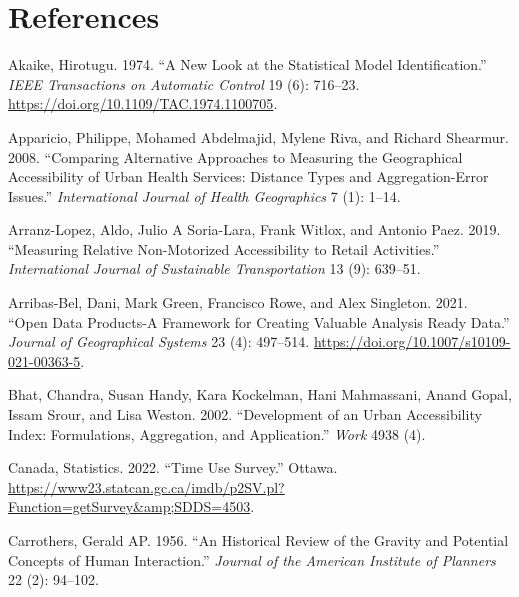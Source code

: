 \documentclass[preprint, 3p,
authoryear]{elsarticle} %
\newlength{\cslhangindent}
\newlength{\cslentryspacingunit} %
\newenvironment{CSLReferences}[2] %
 {%
  \setlength{\parindent}{0pt}
  \ifodd #1
  \let\oldpar\par
  \def\par{\hangindent=\cslhangindent\oldpar}
  \fi
  \setlength{\parskip}{#2\cslentryspacingunit}
 }%
 {}
\begin{document}
\hypertarget{references}{%
\section*{References}\label{references}}

\hypertarget{refs}{}
\begin{CSLReferences}{1}{0}
\leavevmode{}%
Akaike, Hirotugu. 1974. {``A New Look at the Statistical Model
Identification.''} \emph{IEEE Transactions on Automatic Control} 19 (6):
716--23. \url{https://doi.org/10.1109/TAC.1974.1100705}.

\leavevmode{}%
Apparicio, Philippe, Mohamed Abdelmajid, Mylene Riva, and Richard
Shearmur. 2008. {``Comparing Alternative Approaches to Measuring the
Geographical Accessibility of Urban Health Services: Distance Types and
Aggregation-Error Issues.''} \emph{International Journal of Health
Geographics} 7 (1): 1--14.

\leavevmode{}%
Arranz-Lopez, Aldo, Julio A Soria-Lara, Frank Witlox, and Antonio Paez.
2019. {``Measuring Relative Non-Motorized Accessibility to Retail
Activities.''} \emph{International Journal of Sustainable
Transportation} 13 (9): 639--51.

\leavevmode{}%
Arribas-Bel, Dani, Mark Green, Francisco Rowe, and Alex Singleton. 2021.
{``Open Data Products-A Framework for Creating Valuable Analysis Ready
Data.''} \emph{Journal of Geographical Systems} 23 (4): 497--514.
\url{https://doi.org/10.1007/s10109-021-00363-5}.

\leavevmode{}%
Bhat, Chandra, Susan Handy, Kara Kockelman, Hani Mahmassani, Anand
Gopal, Issam Srour, and Lisa Weston. 2002. {``Development of an Urban
Accessibility Index: Formulations, Aggregation, and Application.''}
\emph{Work} 4938 (4).

\leavevmode{}%
Canada, Statistics. 2022. {``Time Use Survey.''} Ottawa.
\url{https://www23.statcan.gc.ca/imdb/p2SV.pl?Function=getSurvey\&amp;SDDS=4503}.

\leavevmode{}%
Carrothers, Gerald AP. 1956. {``An Historical Review of the Gravity and
Potential Concepts of Human Interaction.''} \emph{Journal of the
American Institute of Planners} 22 (2): 94--102.


\end{CSLReferences}
\end{document}
